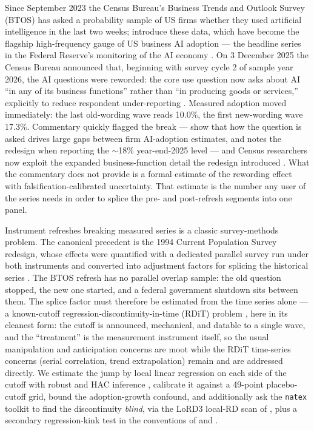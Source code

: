\documentclass[11pt]{article}
\newcommand{\natex}{\texttt{natex}}
\begin{document}
Since September 2023 the Census Bureau's Business Trends and Outlook Survey
(BTOS) has asked a probability sample of US firms whether they used artificial
intelligence in the last two weeks; \cite{bonney2024} introduce these data,
which have become the flagship high-frequency gauge of US business AI adoption
--- the headline series in the Federal Reserve's monitoring of the AI economy
\cite{allen2026}. On 3 December 2025 the Census Bureau announced that,
beginning with survey cycle 2 of sample year 2026, the AI questions were
reworded: the core use question now asks about AI ``in any of its business
functions'' rather than ``in producing goods or services,'' explicitly to
reduce respondent under-reporting \cite{census2025}. Measured adoption moved
immediately: the last old-wording wave reads 10.0\%, the first new-wording wave
17.3\%. Commentary quickly flagged the break --- \cite{bick2026} show that how
the question is asked drives large gaps between firm AI-adoption estimates,
and \cite{allen2026} notes the redesign when reporting the $\sim$18\%
year-end-2025 level --- and Census researchers now exploit the expanded
business-function detail the redesign introduced \cite{bonney2026}. What the
commentary does not provide is a formal estimate of the rewording effect with
falsification-calibrated uncertainty. That estimate is the number any user of
the series needs in order to splice the pre- and post-refresh segments into
one panel.

Instrument refreshes breaking measured series is a classic survey-methods
problem. The canonical precedent is the 1994 Current Population Survey
redesign, whose effects were quantified with a dedicated parallel survey run
under both instruments and converted into adjustment factors for splicing the
historical series \cite{polivka1998}. The BTOS refresh has no parallel
overlap sample: the old question stopped, the new one started, and a federal
government shutdown sits between them. The splice factor must therefore be
estimated from the time series alone --- a known-cutoff
regression-discontinuity-in-time (RDiT) problem \cite{hausman2018}, here in
its cleanest form: the cutoff is announced, mechanical, and datable to a
single wave, and the ``treatment'' is the measurement instrument itself, so
the usual manipulation and anticipation concerns are moot while the RDiT
time-series concerns (serial correlation, trend extrapolation) remain and are
addressed directly. We estimate the jump by local linear regression on each
side of the cutoff with robust and HAC inference \cite{calonico2014,
hausman2018}, calibrate it against a 49-point placebo-cutoff grid, bound the
adoption-growth confound, and additionally ask the \natex{} toolkit
\cite{natex} to find the discontinuity \emph{blind}, via the LoRD3 local-RD
scan of \cite{herlands2018}, plus a secondary regression-kink test in the
conventions of \cite{card2015} and \cite{bockerman2025}.
\end{document}
